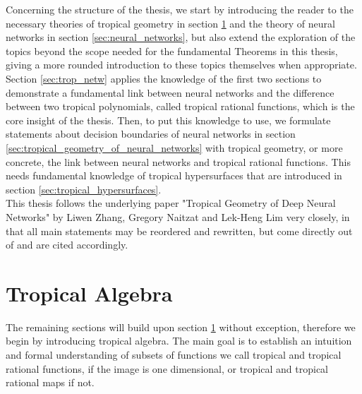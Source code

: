 \documentclass{article}
\theoremstyle{definition}
\begin{document}
Concerning the structure of the thesis, we start by introducing the reader to the necessary theories of tropical geometry in section \ref{sec:trop_algebra} and the theory of neural networks in section \ref{sec:neural_networks}, but also extend the exploration of the topics beyond the scope needed for the fundamental Theorems in this thesis, giving a more rounded introduction to these topics themselves when appropriate. Section \ref{sec:trop_netw} applies the knowledge of the first two sections to demonstrate a fundamental link between neural networks and the difference between two tropical polynomials, called tropical rational functions, which is the core insight of the thesis.
Then, to put this knowledge to use, we formulate statements about decision boundaries of neural networks in section \ref{sec:tropical_geometry_of_neural_networks} with tropical geometry, or more concrete, the link between neural networks and tropical rational functions. This needs fundamental 	knowledge of tropical hypersurfaces that are introduced in section \ref{sec:tropical_hypersurfaces}. \\

This thesis follows the underlying paper "Tropical Geometry of Deep Neural Networks" by Liwen Zhang, Gregory Naitzat and Lek-Heng Lim very closely, in that all main statements may be reordered and rewritten, but come directly out of \cite{zhang2018tropical} and are cited accordingly.

\newpage

\section{Tropical Algebra}
\label{sec:trop_algebra}

The remaining sections will build upon section \ref{sec:trop_algebra} without exception, therefore we begin by introducing tropical algebra. The main goal is to establish an intuition and formal understanding of subsets of functions we call tropical and tropical rational functions, if the image is one dimensional, or tropical and tropical rational maps if not.
\end{document}
